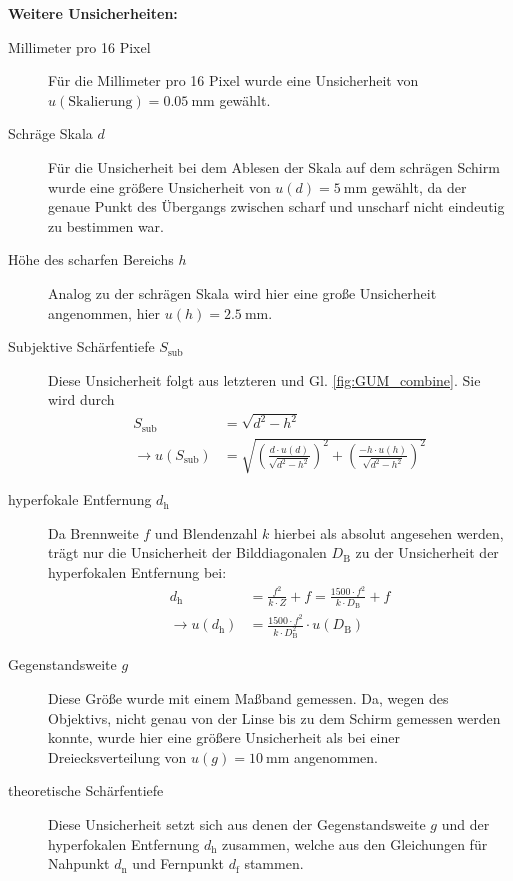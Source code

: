 	\vspace{1cm}	
	\begin{flushleft}
		\textbf{Weitere Unsicherheiten:}
	\end{flushleft}	
	\begin{description}
	
		\item[Millimeter pro 16 Pixel] Für die Millimeter pro 16 Pixel wurde eine Unsicherheit von $u(\text{Skalierung}) = \SI{0,05}{\milli\meter}$ gewählt.
		\item[Schräge Skala $d$] Für die Unsicherheit bei dem Ablesen der Skala auf dem schrägen Schirm wurde eine größere Unsicherheit von $ u(d) = \SI{5}{\milli\meter}$ gewählt, da der genaue Punkt des Übergangs zwischen scharf und unscharf nicht eindeutig zu bestimmen war.
		\item[Höhe des scharfen Bereichs $h$] Analog zu der schrägen Skala wird hier eine große Unsicherheit angenommen, hier $ u(h) = \SI{2,5}{\milli\meter}$.
		\item[Subjektive Schärfentiefe $S_\text{sub}$] Diese Unsicherheit folgt aus letzteren und Gl. \ref{fig:GUM_combine}.
		Sie wird durch 
		\begin{align}
			S_\text{sub} &= \sqrt{d^2-h^2} \\
			\rightarrow u(S_\text{sub}) &= \sqrt{\left( \frac{d\cdot u(d)}{\sqrt{d^2-h^2}}\right)^2 + \left( \frac{- h\cdot u(h)}{\sqrt{d^2-h^2}}\right)^2} 
		\end{align}
		\item[hyperfokale Entfernung $d_\text{h}$] Da Brennweite $f$ und Blendenzahl $k$ hierbei als absolut angesehen werden, trägt nur die Unsicherheit der Bilddiagonalen $D_\text{B}$ zu der Unsicherheit der hyperfokalen Entfernung bei:
		\begin{align}
			d_\text{h} &= \frac{f^2}{k\cdot Z} + f = \frac{1500\cdot f^2}{k\cdot D_\text{B}} + f \\
			\rightarrow u(d_\text{h}) &= \frac{1500\cdot f^2}{k\cdot D_\text{B}^2} \cdot u(D_\text{B})
		\end{align}	
		\item[Gegenstandsweite $g$] Diese Größe wurde mit einem Maßband gemessen. Da, wegen des Objektivs, nicht genau von der Linse bis zu dem Schirm gemessen werden konnte, wurde hier eine größere Unsicherheit als bei einer Dreiecksverteilung von $u(g) = \SI{10}{\milli\meter}$ angenommen.
		\item[theoretische Schärfentiefe] Diese Unsicherheit setzt sich aus denen der Gegenstandsweite $g$ und der hyperfokalen Entfernung $d_\text{h}$ zusammen, welche aus den Gleichungen für Nahpunkt $d_\text{n}$ und Fernpunkt $d_\text{f}$ stammen.

\end{description}
